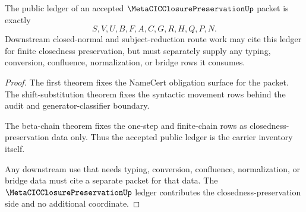 \begin{theorem}
\label{thm:metacic-closure-preservation-ledger-exactness}
The public ledger of an accepted $\MetaCICClosurePreservationUp$ packet is exactly
$$
S,V,U,B,F,A,C,G,R,H,Q,P,N.
$$
Downstream closed-normal and subject-reduction route work may cite this ledger for finite closedness preservation, but must separately supply any typing, conversion, confluence, normalization, or bridge rows it consumes.
\end{theorem}
\begin{proof}
The first theorem fixes the NameCert obligation surface for the packet. The shift-substitution theorem fixes the syntactic movement rows behind the audit and generator-classifier boundary.

The beta-chain theorem fixes the one-step and finite-chain rows as closedness-preservation data only. Thus the accepted public ledger is the carrier inventory itself.

Any downstream use that needs typing, conversion, confluence, normalization, or bridge data must cite a separate packet for that data. The $\MetaCICClosurePreservationUp$ ledger contributes the closedness-preservation side and no additional coordinate.
\end{proof}

